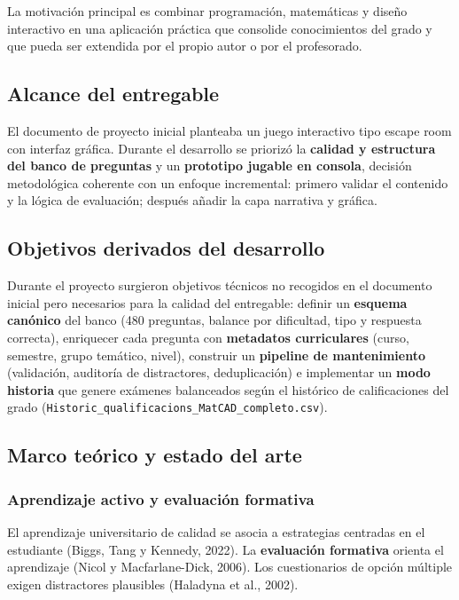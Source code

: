 \documentclass[11pt,a4paper]{article}
\begin{document}
La motivación principal es combinar programación, matemáticas y diseño interactivo en una aplicación práctica que consolide conocimientos del grado y que pueda ser extendida por el propio autor o por el profesorado.

\subsection{Alcance del entregable}

El documento de proyecto inicial planteaba un juego interactivo tipo escape room con interfaz gráfica. Durante el desarrollo se priorizó la \textbf{calidad y estructura del banco de preguntas} y un \textbf{prototipo jugable en consola}, decisión metodológica coherente con un enfoque incremental: primero validar el contenido y la lógica de evaluación; después añadir la capa narrativa y gráfica.

\subsection{Objetivos derivados del desarrollo}

Durante el proyecto surgieron objetivos técnicos no recogidos en el documento inicial pero necesarios para la calidad del entregable: definir un \textbf{esquema canónico} del banco (480 preguntas, balance por dificultad, tipo y respuesta correcta), enriquecer cada pregunta con \textbf{metadatos curriculares} (curso, semestre, grupo temático, nivel), construir un \textbf{pipeline de mantenimiento} (validación, auditoría de distractores, deduplicación) e implementar un \textbf{modo historia} que genere exámenes balanceados según el histórico de calificaciones del grado (\texttt{Historic\_qualificacions\_MatCAD\_completo.csv}).

\subsection{Marco teórico y estado del arte}

\subsubsection{Aprendizaje activo y evaluación formativa}

El aprendizaje universitario de calidad se asocia a estrategias centradas en el estudiante (Biggs, Tang y Kennedy, 2022). La \textbf{evaluación formativa} orienta el aprendizaje (Nicol y Macfarlane-Dick, 2006). Los cuestionarios de opción múltiple exigen distractores plausibles (Haladyna et al., 2002).
\end{document}

